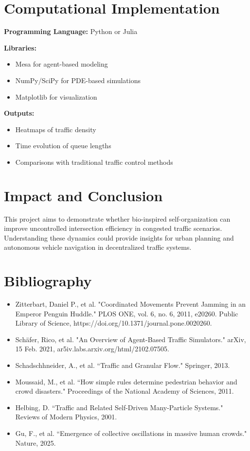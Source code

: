 \documentclass[10pt]{article}
\begin{document}
\section*{Computational Implementation}
\textbf{Programming Language:} Python or Julia 

\vspace{0.25cm}
\textbf{Libraries:}
\begin{itemize}
    \item Mesa for agent-based modeling
    \item NumPy/SciPy for PDE-based simulations
    \item Matplotlib for visualization
\end{itemize}

\textbf{Outputs:}
\begin{itemize}
    \item Heatmaps of traffic density
    \item Time evolution of queue lengths
    \item Comparisons with traditional traffic control methods
\end{itemize}

\section*{Impact and Conclusion}
This project aims to demonstrate whether bio-inspired self-organization can improve uncontrolled intersection efficiency in congested traffic scenarios. 
Understanding these dynamics could provide insights for urban planning and autonomous vehicle navigation in decentralized traffic systems.

\section*{Bibliography}
\begin{itemize}
    \item Zitterbart, Daniel P., et al. "Coordinated Movements Prevent Jamming in an Emperor Penguin Huddle." PLOS ONE, vol. 6, no. 6, 2011, e20260. \newline Public Library of Science, https://doi.org/10.1371/journal.pone.0020260.
    \item Schäfer, Rico, et al. "An Overview of Agent-Based Traffic Simulators." arXiv, 15 Feb. 2021, \newline ar5iv.labs.arxiv.org/html/2102.07505.
    \item Schadschhneider, A., et al. ``Traffic and Granular Flow." Springer, 2013.
    \item Moussaid, M., et al. ``How simple rules determine pedestrian behavior and crowd disasters." Proceedings of the National Academy of Sciences, 2011.
    \item Helbing, D. ``Traffic and Related Self-Driven Many-Particle Systems." Reviews of Modern Physics, 2001.
    \item Gu, F., et al. ``Emergence of collective oscillations in massive human crowds." Nature, 2025. 
\end{itemize}
\end{document}
